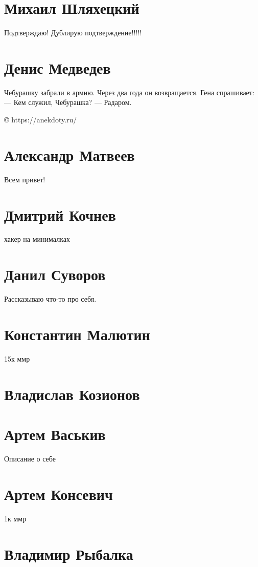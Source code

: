\documentclass{article}
\begin{document}
\section*{Михаил Шляхецкий}

Подтверждаю! Дублирую подтверждение!!!!!

\section*{Денис Медведев}

Чебурашку забрали в армию. Через два года он возвращается. Гена спрашивает:
— Кем служил, Чебурашка?
— Радаром.

© https://anekdoty.ru/
\section*{Александр Матвеев}

Всем привет!


\section*{Дмитрий Кочнев}
хакер на минималках
\section*{Данил Суворов}
Рассказываю что-то про себя.
\section*{Константин Малютин}
 15к ммр
\section*{Владислав Козионов}

\section*{Артем Васькив}
Описание о себе
\section*{Артем Консевич}
1к ммр
\section*{Владимир Рыбалка}
\end{document}
